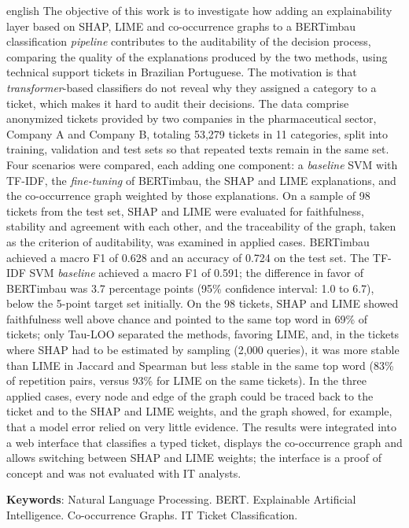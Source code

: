 \documentclass[
    12pt,                %
    openright,           %
    oneside,             %
    a4paper,             %
    english,             %
    brazil               %
]{abntex2}
\begin{document}
\begin{resumo}[Abstract]
\begin{otherlanguage*}{english}
The objective of this work is to investigate how adding an explainability layer based on SHAP, LIME and co-occurrence graphs to a BERTimbau classification \textit{pipeline} contributes to the auditability of the decision process, comparing the quality of the explanations produced by the two methods, using technical support tickets in Brazilian Portuguese. The motivation is that \textit{transformer}-based classifiers do not reveal why they assigned a category to a ticket, which makes it hard to audit their decisions. The data comprise anonymized tickets provided by two companies in the pharmaceutical sector, Company A and Company B, totaling 53,279 tickets in 11 categories, split into training, validation and test sets so that repeated texts remain in the same set. Four scenarios were compared, each adding one component: a \textit{baseline} SVM with TF-IDF, the \textit{fine-tuning} of BERTimbau, the SHAP and LIME explanations, and the co-occurrence graph weighted by those explanations. On a sample of 98 tickets from the test set, SHAP and LIME were evaluated for faithfulness, stability and agreement with each other, and the traceability of the graph, taken as the criterion of auditability, was examined in applied cases. BERTimbau achieved a macro F1 of 0.628 and an accuracy of 0.724 on the test set. The TF-IDF SVM \textit{baseline} achieved a macro F1 of 0.591; the difference in favor of BERTimbau was 3.7 percentage points (95\% confidence interval: 1.0 to 6.7), below the 5-point target set initially.
On the 98 tickets, SHAP and LIME showed faithfulness well above chance and pointed to the same top word in 69\% of tickets; only Tau-LOO separated the methods, favoring LIME, and, in the tickets where SHAP had to be estimated by sampling (2,000 queries), it was more stable than LIME in Jaccard and Spearman but less stable in the same top word (83\% of repetition pairs, versus 93\% for LIME on the same tickets).
In the three applied cases, every node and edge of the graph could be traced back to the ticket and to the SHAP and LIME weights, and the graph showed, for example, that a model error relied on very little evidence.
The results were integrated into a web interface that classifies a typed ticket, displays the co-occurrence graph and allows switching between SHAP and LIME weights; the interface is a proof of concept and was not evaluated with IT analysts.

\vspace{\onelineskip}

\noindent
\textbf{Keywords}: Natural Language Processing. BERT. Explainable Artificial Intelligence. Co-occurrence Graphs. IT Ticket Classification.
\end{otherlanguage*}
\end{resumo}
\end{document}

